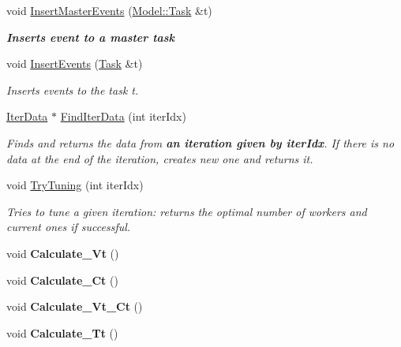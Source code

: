 \begin{DoxyCompactItemize}
void \hyperlink{class_adjusting_n_w_tunlet_ad3e81d78c42451d66cc7c733d3f34330}{Insert\-Master\-Events} (\hyperlink{class_model_1_1_task}{Model\-::\-Task} \&t)
\begin{DoxyCompactList}\small\item\em {\bfseries Inserts event to a master task} \end{DoxyCompactList}\item 
void \hyperlink{class_adjusting_n_w_tunlet_a3b54d7d5c877af146bdf817fcd5582c3}{Insert\-Events} (\hyperlink{class_model_1_1_task}{Task} \&t)
\begin{DoxyCompactList}\small\item\em Inserts events to the task t. \end{DoxyCompactList}\item 
\hyperlink{class_iter_data}{Iter\-Data} $\ast$ \hyperlink{class_adjusting_n_w_tunlet_a49990bd7cd28c3f534ad103c5366084a}{Find\-Iter\-Data} (int iter\-Idx)
\begin{DoxyCompactList}\small\item\em Finds and returns the data from {\bfseries an iteration given by iter\-Idx}. If there is no data at the end of the iteration, creates new one and returns it. \end{DoxyCompactList}\item 
void \hyperlink{class_adjusting_n_w_tunlet_af837545545e62d1984d570bae171272c}{Try\-Tuning} (int iter\-Idx)
\begin{DoxyCompactList}\small\item\em Tries to tune a given iteration\-: returns the optimal number of workers and current ones if successful. \end{DoxyCompactList}\item 
\hypertarget{class_adjusting_n_w_tunlet_aeda7c15dfec965a740181711a340d7df}{void {\bfseries Calculate\-\_\-\-Vt} ()}\label{class_adjusting_n_w_tunlet_aeda7c15dfec965a740181711a340d7df}

\item 
\hypertarget{class_adjusting_n_w_tunlet_a7337b15ce9fedfe1d5dbd1143e19f303}{void {\bfseries Calculate\-\_\-\-Ct} ()}\label{class_adjusting_n_w_tunlet_a7337b15ce9fedfe1d5dbd1143e19f303}

\item 
\hypertarget{class_adjusting_n_w_tunlet_a81acbcff3c05d7b2e89abf09f88b069e}{void {\bfseries Calculate\-\_\-\-Vt\-\_\-\-Ct} ()}\label{class_adjusting_n_w_tunlet_a81acbcff3c05d7b2e89abf09f88b069e}

\item 
\hypertarget{class_adjusting_n_w_tunlet_a88c91438ccb4e59cb870d85e93104c9d}{void {\bfseries Calculate\-\_\-\-Tt} ()}\label{class_adjusting_n_w_tunlet_a88c91438ccb4e59cb870d85e93104c9d}


\end{DoxyCompactItemize}
